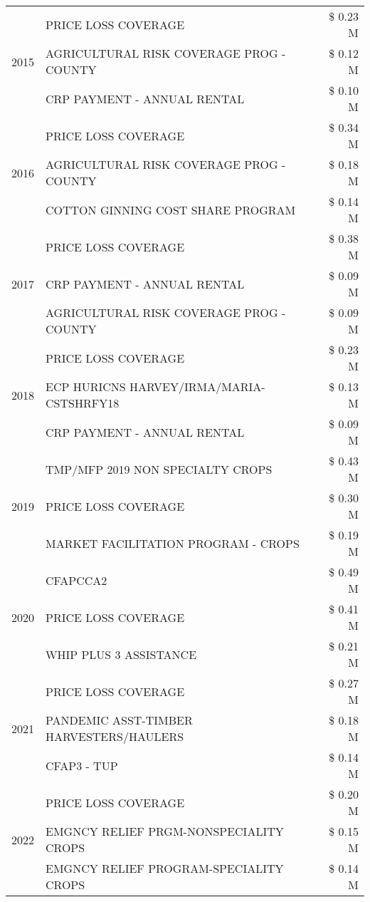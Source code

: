 \begin{tabular}{llr}
\cline{1-3}
\multirow[t]{3}{*}{2015} & PRICE LOSS COVERAGE & \$ 0.23 M \\
 & AGRICULTURAL RISK COVERAGE PROG - COUNTY & \$ 0.12 M \\
 & CRP PAYMENT - ANNUAL RENTAL & \$ 0.10 M \\
\cline{1-3}
\multirow[t]{3}{*}{2016} & PRICE LOSS COVERAGE & \$ 0.34 M \\
 & AGRICULTURAL RISK COVERAGE PROG - COUNTY & \$ 0.18 M \\
 & COTTON GINNING COST SHARE PROGRAM & \$ 0.14 M \\
\cline{1-3}
\multirow[t]{3}{*}{2017} & PRICE LOSS COVERAGE & \$ 0.38 M \\
 & CRP PAYMENT - ANNUAL RENTAL & \$ 0.09 M \\
 & AGRICULTURAL RISK COVERAGE PROG - COUNTY & \$ 0.09 M \\
\cline{1-3}
\multirow[t]{3}{*}{2018} & PRICE LOSS COVERAGE & \$ 0.23 M \\
 & ECP HURICNS HARVEY/IRMA/MARIA-CSTSHRFY18 & \$ 0.13 M \\
 & CRP PAYMENT - ANNUAL RENTAL & \$ 0.09 M \\
\cline{1-3}
\multirow[t]{3}{*}{2019} & TMP/MFP 2019 NON SPECIALTY CROPS & \$ 0.43 M \\
 & PRICE LOSS COVERAGE & \$ 0.30 M \\
 & MARKET FACILITATION PROGRAM - CROPS & \$ 0.19 M \\
\cline{1-3}
\multirow[t]{3}{*}{2020} & CFAPCCA2 & \$ 0.49 M \\
 & PRICE LOSS COVERAGE & \$ 0.41 M \\
 & WHIP PLUS 3 ASSISTANCE & \$ 0.21 M \\
\cline{1-3}
\multirow[t]{3}{*}{2021} & PRICE LOSS COVERAGE & \$ 0.27 M \\
 & PANDEMIC ASST-TIMBER HARVESTERS/HAULERS & \$ 0.18 M \\
 & CFAP3 - TUP & \$ 0.14 M \\
\cline{1-3}
\multirow[t]{3}{*}{2022} & PRICE LOSS COVERAGE & \$ 0.20 M \\
 & EMGNCY RELIEF PRGM-NONSPECIALITY CROPS & \$ 0.15 M \\
 & EMGNCY RELIEF PROGRAM-SPECIALITY CROPS & \$ 0.14 M \\
\cline{1-3}
\bottomrule
\end{tabular}
